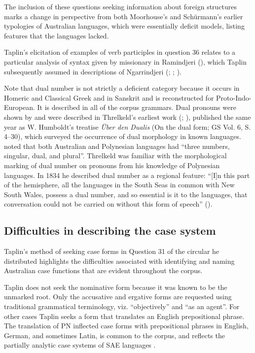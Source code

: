 The inclusion of these questions seeking information about foreign structures marks a change in perspective from both Moorhouse’s and Schürmann’s earlier typologies of Australian languages, which were essentially deficit models, listing features that the languages lacked.

Taplin’s elicitation of examples of verb participles in question 36 relates to a particular analysis of syntax given by missionary \citet{meyer_vocabulary_1843} in Ramindjeri (), which Taplin subsequently assumed in descriptions of Ngarrindjeri (\citeyear{taplin_vocabulary_1867}; \citeyear{taplin_notes_1872}; \citeyear{taplin_grammar_1878}).

Note that dual number is not strictly a deficient category because it occurs in Homeric and Classical Greek and in Sanskrit and is reconstructed for Proto-Indo-European. It is described in all of the corpus grammars. Dual pronouns were shown by \citet[30]{dawes_grammatical_1790} and were described in Threlkeld’s earliest work (\citealt[4--8]{threlkeld_specimens_1927}; ), published the same year as W. Humboldt’s treatise \textit{Über den Dualis} (On the dual form; GS Vol. 6, S. 4–30), which surveyed the occurrence of dual morphology in known languages. \citet[276]{prichard_1847} noted that both Australian and Polynesian languages had ``three numbers, singular, dual, and plural''. Threlkeld was familiar with the morphological marking of dual number on pronouns from his knowledge of Polynesian languages. In 1834 he described dual number as a regional feature: “[I]n this part of the hemisphere, all the languages in the South Seas in common with New South Wales, possess a dual number, and so essential is it to the languages, that conversation could not be carried on without this form of speech” (\citealt[viii]{threlkeld_australian_1834}).

\subsection{Difficulties in describing the case system}
\label{sec:key:2.3.2}

Taplin’s \citeyearpar[6]{taplin_native_1874} method of seeking case forms in Question 31 of the circular he distributed highlights the difficulties associated with identifying and naming Australian case functions that are evident throughout the corpus. 

Taplin does not seek the nominative form because it was known to be the unmarked root. Only the accusative and ergative forms are requested using traditional grammatical terminology, viz. “objectively” and “as an agent''. For other cases Taplin seeks a form that translates an English prepositional phrase. The translation of PN inflected case forms with prepositional phrases in English, German, and sometimes Latin, is common to the corpus, and reflects the partially analytic case systems of SAE languages \citep[9]{blake_case_2001}.

